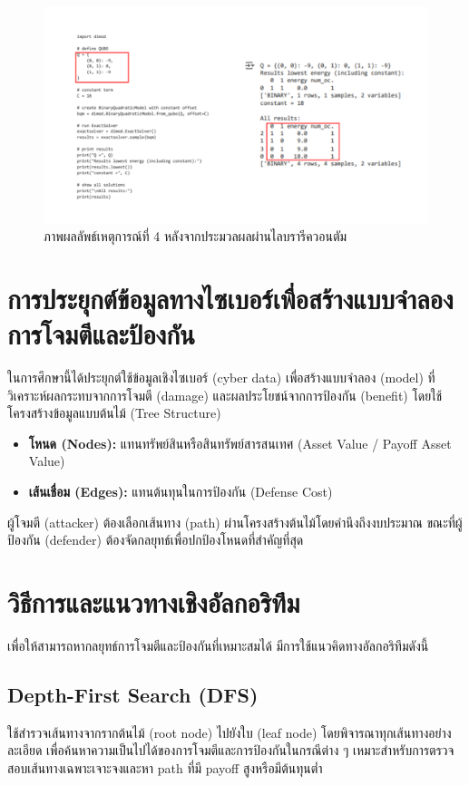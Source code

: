         \begin{figure}
          \begin{center}
          \includegraphics[width=5.5in]{case4_RunPicture.png}
          \end{center}
          \caption[Poem]{ภาพผลลัพธ์เหตุการณ์ที่ 4 หลังจากประมวลผลผ่านไลบรารีควอนตัม }
          \end{figure}
  

\section{การประยุกต์ข้อมูลทางไซเบอร์เพื่อสร้างแบบจำลองการโจมตีและป้องกัน}
ในการศึกษานี้ได้ประยุกต์ใช้ข้อมูลเชิงไซเบอร์ (cyber data) เพื่อสร้างแบบจำลอง (model) ที่วิเคราะห์ผลกระทบจากการโจมตี (damage) และผลประโยชน์จากการป้องกัน (benefit) โดยใช้โครงสร้างข้อมูลแบบต้นไม้ (Tree Structure)

\begin{itemize}
  \item \textbf{โหนด (Nodes):} แทนทรัพย์สินหรือสินทรัพย์สารสนเทศ (Asset Value / Payoff Asset Value)
  \item \textbf{เส้นเชื่อม (Edges):} แทนต้นทุนในการป้องกัน (Defense Cost)
\end{itemize}

ผู้โจมตี (attacker) ต้องเลือกเส้นทาง (path) ผ่านโครงสร้างต้นไม้โดยคำนึงถึงงบประมาณ ขณะที่ผู้ป้องกัน (defender) ต้องจัดกลยุทธ์เพื่อปกป้องโหนดที่สำคัญที่สุด
\section{วิธีการและแนวทางเชิงอัลกอริทึม}

เพื่อให้สามารถหากลยุทธ์การโจมตีและป้องกันที่เหมาะสมได้ มีการใช้แนวคิดทางอัลกอริทึมดังนี้

\subsection{Depth-First Search (DFS)}
ใช้สำรวจเส้นทางจากรากต้นไม้ (root node) ไปยังใบ (leaf node) โดยพิจารณาทุกเส้นทางอย่างละเอียด เพื่อค้นหาความเป็นไปได้ของการโจมตีและการป้องกันในกรณีต่าง ๆ เหมาะสำหรับการตรวจสอบเส้นทางเฉพาะเจาะจงและหา path ที่มี payoff สูงหรือมีต้นทุนต่ำ


